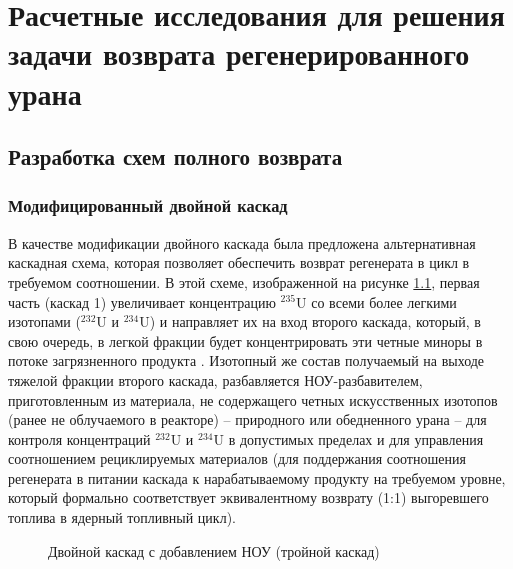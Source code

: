 \chapter{Расчетные исследования для решения задачи возврата регенерированного урана}\label{ch:ch3}

\section{Разработка схем полного возврата}\label{sec:ch2/sec3}
\subsection{Модифицированный двойной каскад}

В качестве модификации двойного каскада была предложена альтернативная каскадная схема, которая позволяет обеспечить возврат регенерата в цикл в требуемом соотношении. В этой схеме, изображенной 
на рисунке \ref{fig:vestnik}, первая часть (каскад 1) увеличивает 
концентрацию $^{235}$U со всеми более легкими изотопами ($^{232}$U и $^{234}$U) и направляет их на вход второго каскада, который, в свою очередь, в легкой фракции будет концентрировать эти четные миноры в потоке загрязненного продукта \cite{smirnovObogashchenieRegenerirovannogoUrana2018}.
Изотопный же состав получаемый на выходе тяжелой фракции второго каскада, разбавляется НОУ-разбавителем, приготовленным из материала, не содержащего четных искусственных изотопов (ранее не облучаемого в реакторе) -- природного или обедненного урана -- для контроля концентраций $^{232}$U и $^{234}$U в допустимых пределах и для управления соотношением рециклируемых материалов (для поддержания соотношения регенерата в питании каскада к нарабатываемому продукту на требуемом уровне, который формально соответствует эквивалентному возврату (1:1) выгоревшего топлива в ядерный топливный цикл).

\begin{figure}[ht]
  \caption{Двойной каскад с добавлением НОУ (тройной каскад)}\label{fig:vestnik}
\end{figure}


